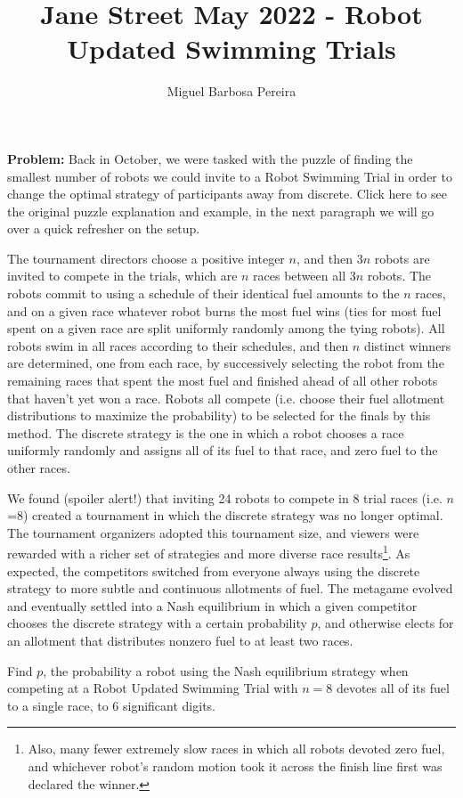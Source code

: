 \documentclass[]{article}
\title{Jane Street May 2022 - Robot Updated Swimming Trials}
\author{Miguel Barbosa Pereira}
\theoremstyle{plain}      %
\theoremstyle{definition} %
\begin{document}
\maketitle

\textbf{Problem:} Back in October, we were tasked with the puzzle of finding the smallest number of robots we could invite to a Robot Swimming Trial in order to change the optimal strategy of participants away from discrete. Click here to see the original puzzle explanation and example, in the next paragraph we will go over a quick refresher on the setup.

The tournament directors choose a positive integer $n$, and then $3n$ robots are invited to compete in the trials, which are $n$ races between all $3n$ robots. The robots commit to using a schedule of their identical fuel amounts to the $n$ races, and on a given race whatever robot burns the most fuel wins (ties for most fuel spent on a given race are split uniformly randomly among the tying robots). All robots swim in all races according to their schedules, and then $n$ distinct winners are determined, one from each race, by successively selecting the robot from the remaining races that spent the most fuel and finished ahead of all other robots that haven't yet won a race. Robots all compete (i.e. choose their fuel allotment distributions to maximize the probability) to be selected for the finals by this method. The discrete strategy is the one in which a robot chooses a race uniformly randomly and assigns all of its fuel to that race, and zero fuel to the other races.

We found (spoiler alert!) that inviting 24 robots to compete in 8 trial races (i.e. $n$=8) created a tournament in which the discrete strategy was no longer optimal. The tournament organizers adopted this tournament size, and viewers were rewarded with a richer set of strategies and more diverse race results\footnote{Also, many fewer extremely slow races in which all robots devoted zero fuel, and whichever robot's random motion took it across the finish line first was declared the winner.}. As expected, the competitors switched from everyone always using the discrete strategy to more subtle and continuous allotments of fuel. The metagame evolved and eventually settled into a Nash equilibrium in which a given competitor chooses the discrete strategy with a certain probability $p$, and otherwise elects for an allotment that distributes nonzero fuel to at least two races.

Find $p$, the probability a robot using the Nash equilibrium strategy when competing at a Robot Updated Swimming Trial with $n=8$ devotes all of its fuel to a single race, to 6 significant digits.
\end{document}
